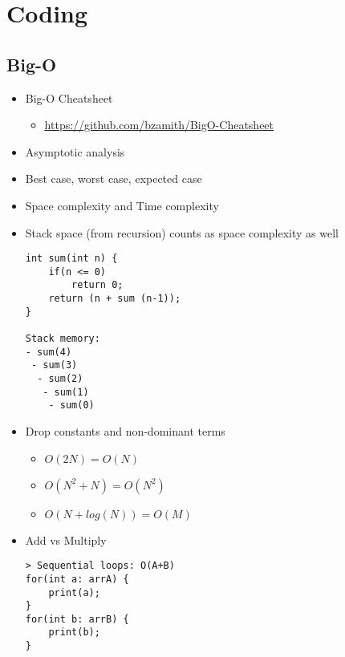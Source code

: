 \documentclass[a4paper, 11.25pt]{article}
\begin{document}
\clearpage
\section{Coding}
\subsection{Big-O}
\begin{itemize}
    \item Big-O Cheatsheet
    \begin{itemize}
        \item \url{https://github.com/bzamith/BigO-Cheatsheet}
    \end{itemize}
    \item Asymptotic analysis
    \item Best case, worst case, expected case
    \item Space complexity and Time complexity
    \item Stack space (from recursion) counts as space complexity as well
    \begin{lstlisting}[style=CStyle]
int sum(int n) {
    if(n <= 0)
        return 0;
    return (n + sum (n-1));
}

Stack memory:
- sum(4)
 - sum(3)
  - sum(2)
   - sum(1)
    - sum(0)\end{lstlisting}
    \item Drop constants and non-dominant terms
    \begin{itemize}
        \item $O(2N) = O(N)$
        \item $O(N^{2} + N) = O(N^{2})$
        \item $O(N+ log(N)) = O(M)$
    \end{itemize}
    \item Add vs Multiply
    \begin{lstlisting}[style=CStyle]
> Sequential loops: O(A+B)
for(int a: arrA) {
    print(a);
}
for(int b: arrB) {
    print(b);
}


\end{lstlisting}
\end{itemize}
\end{document}
